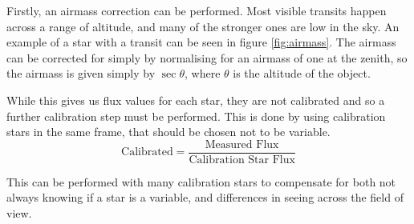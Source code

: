 Firstly, an airmass correction can be performed. Most visible transits happen across a range of altitude, and many of the stronger ones are low in the sky. An example of a star with a transit can be seen in figure \ref{fig:airmass}. The airmass can be corrected for simply by normalising for an airmass of one at the zenith, so the airmass is given simply by $\sec \theta$, where $\theta$ is the altitude of the object.

While this gives us flux values for each star, they are not calibrated and so a further calibration step must be performed. This is done by using calibration stars in the same frame, that should be chosen not to be variable.
\[ \text{Calibrated} = \frac{\text{Measured Flux}}{\text{Calibration Star Flux}} \]

This can be performed with many calibration stars to compensate for both not always knowing if a star is a variable, and  differences in seeing across the field of view.
